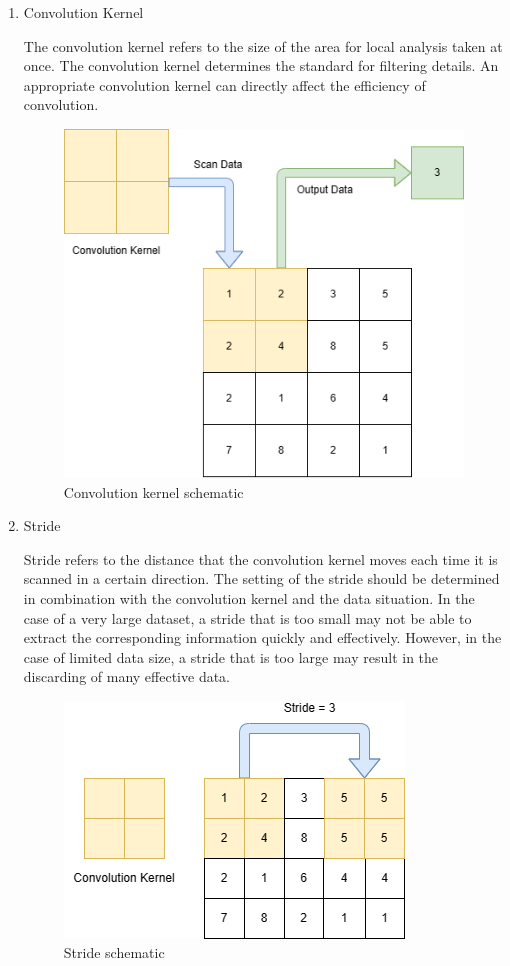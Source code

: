 \documentclass[10pt,journal,compsoc]{IEEEtran}
\begin{document}
\begin{enumerate}
    \item Convolution Kernel

The convolution kernel refers to the size of the area for local analysis taken at once. The convolution kernel determines the standard for filtering details. An appropriate convolution kernel can directly affect the efficiency of convolution.

\begin{figure}
    \centering
    \includegraphics[scale=0.4] {PNG/2-8.png}
    \caption{Convolution kernel schematic}
    \label{fig:2-8}
\end{figure}

    \item Stride

Stride refers to the distance that the convolution kernel moves each time it is scanned in a certain direction. The setting of the stride should be determined in combination with the convolution kernel and the data situation. In the case of a very large dataset, a stride that is too small may not be able to extract the corresponding information quickly and effectively. However, in the case of limited data size, a stride that is too large may result in the discarding of many effective data.

\begin{figure}
    \centering
    \includegraphics[scale=0.6] {PNG/2-9.png}
    \caption{Stride schematic}
    \label{fig:2-9}
\end{figure}


\end{enumerate}
\end{document}
